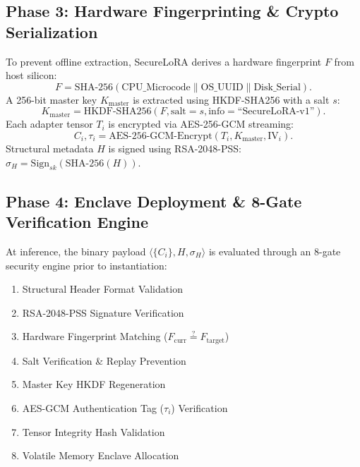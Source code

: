 \documentclass[10pt,conference,compsocconf]{IEEEtran}
\begin{document}
\subsection{Phase 3: Hardware Fingerprinting \& Crypto Serialization}
To prevent offline extraction, SecureLoRA derives a hardware fingerprint $F$ from host silicon:
\begin{equation}
F = \text{SHA-256}(\text{CPU\_Microcode} \parallel \text{OS\_UUID} \parallel \text{Disk\_Serial}).
\end{equation}
A 256-bit master key $K_{\text{master}}$ is extracted using HKDF-SHA256 with a salt $s$:
\begin{equation}
K_{\text{master}} = \text{HKDF-SHA256}(F, \text{salt}=s, \text{info}=\text{``SecureLoRA-v1''}).
\end{equation}
Each adapter tensor $T_i$ is encrypted via AES-256-GCM streaming:
\begin{equation}
C_i, \tau_i = \text{AES-256-GCM-Encrypt}(T_i, K_{\text{master}}, \text{IV}_i).
\end{equation}
Structural metadata $H$ is signed using RSA-2048-PSS: $\sigma_H = \text{Sign}_{sk}(\text{SHA-256}(H))$.

\subsection{Phase 4: Enclave Deployment \& 8-Gate Verification Engine}
At inference, the binary payload $\langle \{C_i\}, H, \sigma_H \rangle$ is evaluated through an 8-gate security engine prior to instantiation:
\begin{enumerate}
    \item Structural Header Format Validation
    \item RSA-2048-PSS Signature Verification
    \item Hardware Fingerprint Matching ($F_{\text{curr}} \stackrel{?}{=} F_{\text{target}}$)
    \item Salt Verification \& Replay Prevention
    \item Master Key HKDF Regeneration
    \item AES-GCM Authentication Tag ($\tau_i$) Verification
    \item Tensor Integrity Hash Validation
    \item Volatile Memory Enclave Allocation
\end{enumerate}

\end{document}
